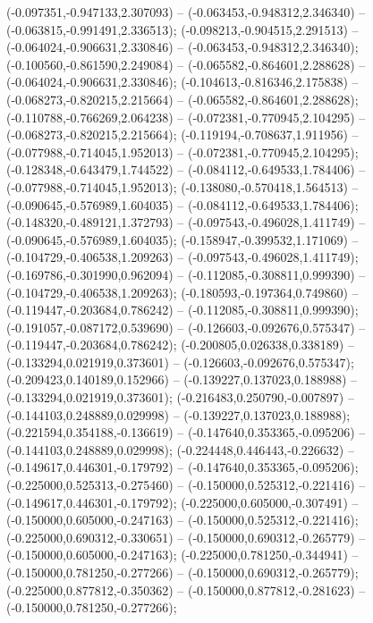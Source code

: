 (-0.097351,-0.947133,2.307093) -- (-0.063453,-0.948312,2.346340) -- (-0.063815,-0.991491,2.336513);
 (-0.098213,-0.904515,2.291513) -- (-0.064024,-0.906631,2.330846) -- (-0.063453,-0.948312,2.346340);
 (-0.100560,-0.861590,2.249084) -- (-0.065582,-0.864601,2.288628) -- (-0.064024,-0.906631,2.330846);
 (-0.104613,-0.816346,2.175838) -- (-0.068273,-0.820215,2.215664) -- (-0.065582,-0.864601,2.288628);
 (-0.110788,-0.766269,2.064238) -- (-0.072381,-0.770945,2.104295) -- (-0.068273,-0.820215,2.215664);
 (-0.119194,-0.708637,1.911956) -- (-0.077988,-0.714045,1.952013) -- (-0.072381,-0.770945,2.104295);
 (-0.128348,-0.643479,1.744522) -- (-0.084112,-0.649533,1.784406) -- (-0.077988,-0.714045,1.952013);
 (-0.138080,-0.570418,1.564513) -- (-0.090645,-0.576989,1.604035) -- (-0.084112,-0.649533,1.784406);
 (-0.148320,-0.489121,1.372793) -- (-0.097543,-0.496028,1.411749) -- (-0.090645,-0.576989,1.604035);
 (-0.158947,-0.399532,1.171069) -- (-0.104729,-0.406538,1.209263) -- (-0.097543,-0.496028,1.411749);
 (-0.169786,-0.301990,0.962094) -- (-0.112085,-0.308811,0.999390) -- (-0.104729,-0.406538,1.209263);
 (-0.180593,-0.197364,0.749860) -- (-0.119447,-0.203684,0.786242) -- (-0.112085,-0.308811,0.999390);
 (-0.191057,-0.087172,0.539690) -- (-0.126603,-0.092676,0.575347) -- (-0.119447,-0.203684,0.786242);
 (-0.200805,0.026338,0.338189) -- (-0.133294,0.021919,0.373601) -- (-0.126603,-0.092676,0.575347);
 (-0.209423,0.140189,0.152966) -- (-0.139227,0.137023,0.188988) -- (-0.133294,0.021919,0.373601);
 (-0.216483,0.250790,-0.007897) -- (-0.144103,0.248889,0.029998) -- (-0.139227,0.137023,0.188988);
 (-0.221594,0.354188,-0.136619) -- (-0.147640,0.353365,-0.095206) -- (-0.144103,0.248889,0.029998);
 (-0.224448,0.446443,-0.226632) -- (-0.149617,0.446301,-0.179792) -- (-0.147640,0.353365,-0.095206);
 (-0.225000,0.525313,-0.275460) -- (-0.150000,0.525312,-0.221416) -- (-0.149617,0.446301,-0.179792);
 (-0.225000,0.605000,-0.307491) -- (-0.150000,0.605000,-0.247163) -- (-0.150000,0.525312,-0.221416);
 (-0.225000,0.690312,-0.330651) -- (-0.150000,0.690312,-0.265779) -- (-0.150000,0.605000,-0.247163);
 (-0.225000,0.781250,-0.344941) -- (-0.150000,0.781250,-0.277266) -- (-0.150000,0.690312,-0.265779);
 (-0.225000,0.877812,-0.350362) -- (-0.150000,0.877812,-0.281623) -- (-0.150000,0.781250,-0.277266);
